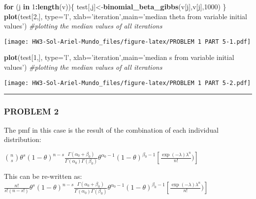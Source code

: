 \documentclass[
]{article}
\newenvironment{Shaded}{\begin{snugshade}}{\end{snugshade}}
\newcommand{\CommentTok}[1]{\textcolor[rgb]{0.56,0.35,0.01}{\textit{#1}}}
\newcommand{\ControlFlowTok}[1]{\textcolor[rgb]{0.13,0.29,0.53}{\textbf{#1}}}
\newcommand{\DataTypeTok}[1]{\textcolor[rgb]{0.13,0.29,0.53}{#1}}
\newcommand{\DecValTok}[1]{\textcolor[rgb]{0.00,0.00,0.81}{#1}}
\newcommand{\KeywordTok}[1]{\textcolor[rgb]{0.13,0.29,0.53}{\textbf{#1}}}
\newcommand{\NormalTok}[1]{#1}
\newcommand{\OperatorTok}[1]{\textcolor[rgb]{0.81,0.36,0.00}{\textbf{#1}}}
\newcommand{\StringTok}[1]{\textcolor[rgb]{0.31,0.60,0.02}{#1}}
\begin{document}
\begin{Shaded}
\begin{Highlighting}[]
\ControlFlowTok{for}\NormalTok{ (j }\ControlFlowTok{in} \DecValTok{1}\OperatorTok{:}\KeywordTok{length}\NormalTok{(v))\{}
\NormalTok{test[,j]<-}\KeywordTok{binomial_beta_gibbs}\NormalTok{(v[j],v[j],}\DecValTok{1000}\NormalTok{)}
\NormalTok{\}}
\KeywordTok{plot}\NormalTok{(test[}\DecValTok{2}\NormalTok{,], }\DataTypeTok{type=}\StringTok{'l'}\NormalTok{, }\DataTypeTok{xlab=}\StringTok{'iteration'}\NormalTok{,}\DataTypeTok{main=}\StringTok{'median theta from variable initial values'}\NormalTok{) }\CommentTok{#plotting the median values of all iterations}
\end{Highlighting}
\end{Shaded}

\texttt{[image: HW3-Sol-Ariel-Mundo\_files/figure-latex/PROBLEM 1 PART 5-1.pdf]}

\begin{Shaded}
\begin{Highlighting}[]
\KeywordTok{plot}\NormalTok{(test[}\DecValTok{1}\NormalTok{,], }\DataTypeTok{type=}\StringTok{'l'}\NormalTok{, }\DataTypeTok{xlab=}\StringTok{'iteration'}\NormalTok{,}\DataTypeTok{main=}\StringTok{'median s from variable initial values'}\NormalTok{) }\CommentTok{#plotting the median values of all iterations}
\end{Highlighting}
\end{Shaded}

\texttt{[image: HW3-Sol-Ariel-Mundo\_files/figure-latex/PROBLEM 1 PART 5-2.pdf]}

\begin{center}\rule{0.5\linewidth}{0.5pt}\end{center}

\hypertarget{problem-2}{%
\subsubsection{PROBLEM 2}\label{problem-2}}

The pmf in this case is the result of the combination of each individual
distribution:

\({n\choose s} \theta^{s}(1-\theta)^{n-s} \frac{\Gamma(\alpha_0+\beta_0)}{\Gamma(\alpha_0)\Gamma(\beta_0)}\theta^{\alpha_0-1}(1-\theta)^{\beta_0-1}\left[\frac{\exp(-\lambda)\lambda^{n}}{n!})\right]\)

This can be re-written as:
\(\frac{n!}{s!(n-s!)}\theta^{s}(1-\theta)^{n-s} \frac{\Gamma(\alpha_0+\beta_0)}{\Gamma(\alpha_0)\Gamma(\beta_0)}\theta^{\alpha_0-1}(1-\theta)^{\beta_0-1}\left[\frac{\exp(-\lambda)\lambda^{n}}{n!})\right]\)
\end{document}
